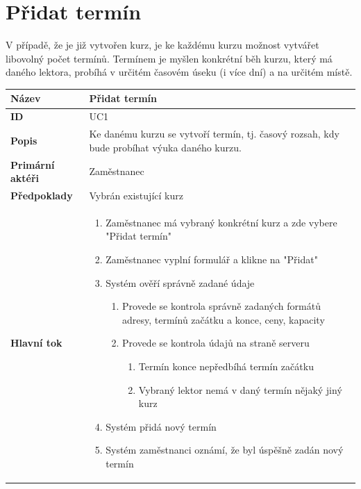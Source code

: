 \documentclass[12pt,a4paper,titlepage,final]{report}
\begin{document}
\section{Přidat termín}

V případě, že je již vytvořen kurz, je ke každému kurzu možnost vytvářet libovolný počet termínů. Termínem je myšlen konkrétní běh kurzu, který má daného lektora, probíhá v určitém časovém úseku (i více dní) a na určitém místě.

\begin{table}[h!]
	\begin{center}
    \begin{tabular}{ | p{4.5cm} | p{13cm} | }
    \hline
    \textbf{Název} & Přidat termín 
    \\ \hline
    
	\textbf{ID} & UC1
	\\ \hline
	
	\textbf{Popis} & Ke danému kurzu se vytvoří termín, tj. časový rozsah, kdy bude probíhat výuka daného kurzu. 
	\\ \hline
	    
	\textbf{Primární aktéři} & Zaměstnanec
	\\ \hline
	
	\textbf{Předpoklady} & Vybrán existující kurz
    \\ \hline                
    
    \textbf{Hlavní tok} &
    \vspace{-3.5mm}    
    \begin{enumerate}
    	\itemsep0em 
    	\item Zaměstnanec má vybraný konkrétní kurz a zde vybere "Přidat termín"
	    \item Zaměstnanec vyplní formulář a klikne na "Přidat"  	
	  	\item Systém ověří správně zadané údaje
	  	\begin{enumerate}
		  	\itemsep0em 
	  		\item Provede se kontrola správně zadaných formátů adresy, termínů začátku a konce, ceny, kapacity
	  		\item Provede se kontrola údajů na straně serveru
	  		\begin{enumerate}
			  	\itemsep0em 
	  			\item Termín konce nepředbíhá termín začátku
	  			\item Vybraný lektor nemá v daný termín nějaký jiný kurz
	  		\end{enumerate}
		\end{enumerate}
	    \item Systém přidá nový termín 
	    \item Systém zaměstnanci oznámí, že byl úspěšně zadán nový termín
	\end{enumerate}     
    \\ \hline
    

\end{tabular}
\end{center}
\end{table}
\end{document}
